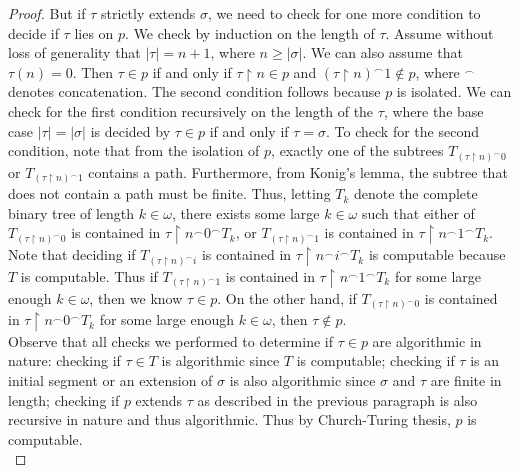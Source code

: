 \documentclass{article}
\begin{document}
\begin{enumerate}[label={\bf Q\arabic*:}]
\begin{proof}
      But if $\tau$ strictly extends $\sigma$, we need to check for one
      more condition to decide if $\tau$ lies on $p$. We check by induction
      on the length of $\tau$. Assume without loss of generality that
      $|\tau|=n+1$, where $n\geq|\sigma|$. We can also assume that
      $\tau(n)=0$. Then $\tau\in p$ if and only if $\tau\restriction n\in
      p$ and $(\tau\restriction n)^\frown1 \not\in p$, where $^\frown$
      denotes concatenation. The second condition follows because $p$ is
      isolated. We can check for the first condition recursively on the
      length of the $\tau$, where the base case $|\tau|=|\sigma|$ is
      decided by $\tau\in p$ if and only if $\tau=\sigma$. To check for the
      second condition, note that from the isolation of $p$, exactly one of
      the subtrees $T_{(\tau\restriction n)^\frown0}$ or
      $T_{(\tau\restriction n)^\frown1}$ contains a path. Furthermore, from
      Konig's lemma, the subtree that does not contain a path must be
      finite. Thus, letting $T_k$ denote the complete binary tree of length
      $k\in\omega$, there exists some large $k\in\omega$ such that either
      of $T_{(\tau\restriction n)^\frown0}$ is contained in
      $\tau\restriction n^\frown0^\frown T_k$, or $T_{(\tau\restriction
      n)^\frown1}$ is contained in $\tau\restriction n^\frown1^\frown T_k$.
      Note that deciding if $T_{(\tau\restriction n)^\frown i}$ is
      contained in $\tau\restriction n^\frown i^\frown T_k$ is computable
      because $T$ is computable. Thus if $T_{(\tau\restriction n)^\frown1}$
      is contained in $\tau\restriction n^\frown1^\frown T_k$ for some
      large enough $k\in\omega$, then we know $\tau\in p$. On the other
      hand, if $T_{(\tau\restriction n)^\frown0}$ is contained in
      $\tau\restriction n^\frown0^\frown T_k$ for some large enough
      $k\in\omega$, then $\tau\not\in p$. \\

      Observe that all checks we performed to determine if $\tau\in p$ are
      algorithmic in nature: checking if $\tau\in T$ is algorithmic since
      $T$ is computable; checking if $\tau$ is an initial segment or an
      extension of $\sigma$ is also algorithmic since $\sigma$ and $\tau$
      are finite in length; checking if $p$ extends $\tau$ as described in
      the previous paragraph is also recursive in nature and thus
      algorithmic. Thus by Church-Turing thesis, $p$ is computable. \\


\end{proof}
\end{enumerate}
\end{document}
